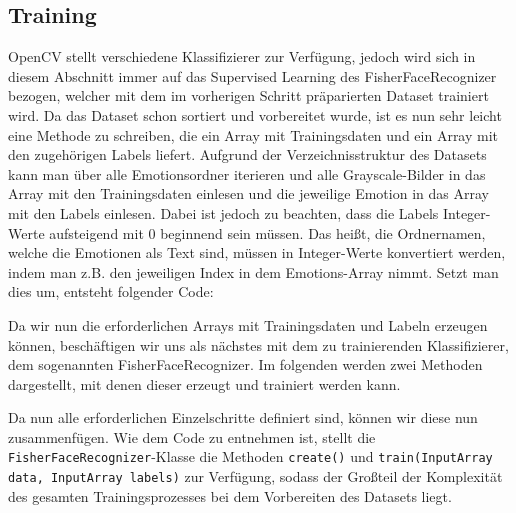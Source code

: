 \documentclass[12pt, a4paper]{report}
\begin{document}
\subsection{Training}
OpenCV stellt verschiedene Klassifizierer zur Verfügung, jedoch wird sich in diesem Abschnitt immer auf das Supervised Learning des FisherFaceRecognizer bezogen, welcher mit dem im vorherigen Schritt präparierten Dataset trainiert wird. Da das Dataset schon sortiert und vorbereitet wurde, ist es nun sehr leicht eine Methode zu schreiben, die ein Array mit Trainingsdaten und ein Array mit den zugehörigen Labels liefert. Aufgrund der Verzeichnisstruktur des Datasets kann man über alle Emotionsordner iterieren und alle Grayscale-Bilder in das Array mit den Trainingsdaten einlesen und die jeweilige Emotion in das Array mit den Labels einlesen. Dabei ist jedoch zu beachten, dass die Labels Integer-Werte aufsteigend mit 0 beginnend sein müssen. Das heißt, die Ordnernamen, welche die Emotionen als Text sind, müssen in Integer-Werte konvertiert werden, indem man z.B. den jeweiligen Index in dem Emotions-Array  nimmt. Setzt man dies um, entsteht folgender Code:

Da wir nun die erforderlichen Arrays mit Trainingsdaten und Labeln erzeugen können, beschäftigen wir uns als nächstes mit dem zu trainierenden Klassifizierer, dem sogenannten FisherFaceRecognizer. Im folgenden werden zwei Methoden dargestellt, mit denen dieser erzeugt und trainiert werden kann.

Da nun alle erforderlichen Einzelschritte definiert sind, können wir diese nun zusammenfügen. 
Wie dem Code zu entnehmen ist, stellt die \texttt{FisherFaceRecognizer}-Klasse die Methoden \texttt{create()} und \texttt{train(InputArray data, InputArray labels)} zur Verfügung, sodass der Großteil der Komplexität des gesamten Trainingsprozesses bei dem Vorbereiten des Datasets liegt.
\end{document}
